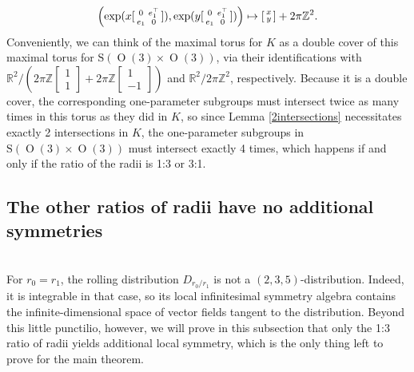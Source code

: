 \documentclass[12pt,a4paper]{amsart}
\theoremstyle{definition}
\DeclareMathOperator{\Orth}{O}
\newenvironment{smallbmatrix}
  {\left[\begin{smallmatrix}}
  {\end{smallmatrix}\right]}
\begin{document}
\[\left(\exp(x[\begin{smallmatrix}0 & e_1^\top \\ e_1 & 0\end{smallmatrix}]),\exp(y[\begin{smallmatrix}0 & e_1^\top \\ e_1 & 0\end{smallmatrix}])\right)\mapsto\begin{smallbmatrix}x \\ y\end{smallbmatrix}+2\pi\mathbb{Z}^2.\]
Conveniently, we can think of the maximal torus for $K$ as a double cover of this maximal torus for $\mathrm{S}(\Orth(3)\times\Orth(3))$, via their identifications with $\mathbb{R}^2/(2\pi\mathbb{Z}[\begin{smallmatrix}1 \\ 1\end{smallmatrix}]+2\pi\mathbb{Z}[\begin{smallmatrix}1 \\ -1\end{smallmatrix}])$ and $\mathbb{R}^2/2\pi\mathbb{Z}^2$, respectively. Because it is a double cover, the corresponding one-parameter subgroups must intersect twice as many times in this torus as they did in $K$, so since Lemma \ref{2intersections} necessitates exactly 2 intersections in $K$, the one-parameter subgroups in $\mathrm{S}(\Orth(3)\times\Orth(3))$ must intersect exactly 4 times, which happens if and only if the ratio of the radii is 1:3 or 3:1.

\subsection{The other ratios of radii have no additional symmetries}\label{otherratios}\hfill \\
For $r_0=r_1$, the rolling distribution $D_{r_0/r_1}$ is not a $(2,3,5)$-distribution. Indeed, it is integrable in that case, so its local infinitesimal symmetry algebra contains the infinite-dimensional space of vector fields tangent to the distribution. Beyond this little punctilio, however, we will prove in this subsection that only the 1:3 ratio of radii yields additional local symmetry, which is the only thing left to prove for the main theorem.
\end{document}
